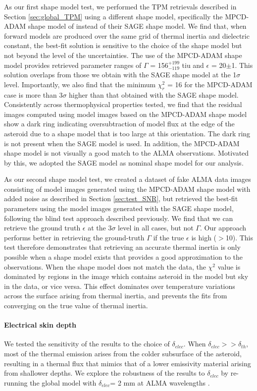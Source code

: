 \documentclass[]{aastex631}
\begin{document}
As our first shape model test, we performed the TPM retrievals described in Section \ref{sec:global_TPM} using a different shape model, specifically the MPCD-ADAM shape model of \cite{ferrais2022} instead of their SAGE shape model. We find that, when forward models are produced over the same grid of thermal inertia and dielectric constant, the best-fit solution is sensitive to the choice of the shape model but not beyond the level of the uncertainties. The use of the MPCD-ADAM shape model provides retrieved parameter ranges of $\Gamma$ = 156$^{+199}_{-119}$ tiu and $\epsilon$ = 20$\pm$1. This solution overlaps from those we obtain with the SAGE shape model at the 1$\sigma$ level. Importantly, we also find that the minimum $\chi_r^2$ = 16 for the MPCD-ADAM case is more than 3$\sigma$ higher than that obtained with the SAGE shape model. Consistently across thermophysical properties tested, we find that the residual images computed using model images based on the MPCD-ADAM shape model show a dark ring indicating oversubtraction of model flux at the edge of the asteroid due to a shape model that is too large at this orientation. The dark ring is not present when the SAGE model is used. In addition, the MPCD-ADAM shape model is not visually a good match to the ALMA observations. Motivated by this, we adopted the SAGE model as nominal shape model for our analysis.

As our second shape model test, we created a dataset of fake ALMA data images consisting of model images generated using the MPCD-ADAM shape model with added noise as described in Section \ref{sec:test_SNR}, but retrieved the best-fit parameters using the model images generated with the SAGE shape model, following the blind test approach described previously. We find that we can retrieve the ground truth $\epsilon$ at the 3$\sigma$ level in all cases, but not $\Gamma$. Our approach performs better in retrieving the ground-truth $\Gamma$ if the true $\epsilon$ is high ($>$10). This test therefore demonstrates that retrieving an accurate thermal inertia is only possible when a shape model exists that provides a good approximation to the observations. When the shape model does not match the data, the $\chi^2$ value is dominated by regions in the image which contains asteroid in the model but sky in the data, or vice versa. This effect dominates over temperature variations across the surface arising from thermal inertia, and prevents the fits from converging on the true value of thermal inertia.

\paragraph{Electrical skin depth}\label{sec:tests_delec}
We tested the sensitivity of the results to the choice of $\delta_{elec}$. When $\delta_{elec}>>\delta_{th}$, most of the thermal emission arises from the colder subsurface of the asteroid, resulting in a thermal flux that mimics that of a lower emissivity material arising from shallower depths. We explore the robustness of the results to $\delta_{elec}$ by re-running the global model with $\delta_{elec}$= 2 mm at ALMA wavelengths \cite[the value used for M-type asteroid (16) Psyche in][]{dekleer2021,cambioni2022}.
\end{document}

